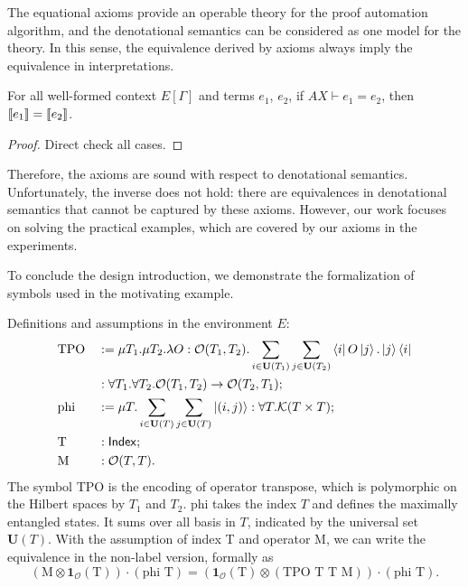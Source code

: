 \documentclass[runningheads]{llncs}
\begin{document}
The equational axioms provide an operable theory for the proof automation algorithm,
and the denotational semantics can be considered as one model for the theory.
In this sense, the equivalence derived by axioms always imply the equivalence in interpretations.
\begin{lemma}
    For all well-formed context $E[\Gamma]$ and terms $e_1$, $e_2$, if $AX \vdash e_1 = e_2$, then ${\llbracket e_1 \rrbracket} = {\llbracket e_2 \rrbracket}$.
\end{lemma}
\begin{proof}
    Direct check all cases.
\end{proof}

Therefore, the axioms are sound with respect to denotational semantics. 
Unfortunately, the inverse does not hold: there are equivalences in denotational semantics that cannot be captured by these axioms. 
However, our work focuses on solving the practical examples, which are covered by our axioms in the experiments.

To conclude the design introduction, we demonstrate the formalization of symbols used in the motivating example.
\begin{example}
    \label{ex: formalizing motivating}
    Definitions and assumptions in the environment $E$:
    \begin{align*}
        & \textrm{TPO} && := \mu T_1. \mu T_2. \lambda O : \mathcal{O}(T_1, T_2). \sum_{i \in \mathbf{U}(T_1)} \sum_{j \in \mathbf{U}(T_2)} \bra{i} O \ket{j} . \ket{j}\bra{i} \\
        & && : \forall T_1. \forall T_2. \mathcal{O}(T_1, T_2) \to \mathcal{O}(T_2, T_1); \\
        & \textrm{phi} && := \mu T. \sum_{i \in \mathbf{U}(T)} \sum_{j \in \mathbf{U}(T)} \ket{(i, j)} : \forall T.\mathcal{K}(T \times T); \\
        & \textrm{T} && : \mathsf{Index}; \\
        & \textrm{M} && : \mathcal{O}(T, T).
    \end{align*}
    The symbol TPO is the encoding of operator transpose, which is polymorphic on the Hilbert spaces by $T_1$ and $T_2$.
    phi takes the index $T$ and defines the maximally entangled states. It sums over all basis in $T$, indicated by the universal set $\mathbf{U}(T)$.
    With the assumption of index T and operator M, we can write the equivalence in the non-label version, formally as 
    \[
        (\textrm{M} \otimes \mathbf{1}_\mathcal{O}(\textrm{T})) \cdot (\textrm{phi T}) = (\mathbf{1}_\mathcal{O}(\textrm{T}) \otimes (\textrm{TPO T T M})) \cdot (\textrm{phi T}).
    \]
\end{example}
\end{document}
